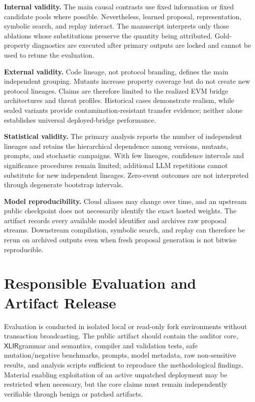 \documentclass[journal]{IEEEtran}
\theoremstyle{definition}
\newcommand{\xlir}{\ensuremath{\mathsf{XLIR}}}
\begin{document}
\noindent\textbf{Internal validity.} The main causal contrasts use fixed information or fixed candidate pools where possible. Nevertheless, learned proposal, representation, symbolic search, and replay interact. The manuscript interprets only those ablations whose substitutions preserve the quantity being attributed. Gold-property diagnostics are executed after primary outputs are locked and cannot be used to retune the evaluation.

\noindent\textbf{External validity.} Code lineage, not protocol branding, defines the main independent grouping. Mutants increase property coverage but do not create new protocol lineages. Claims are therefore limited to the realized EVM bridge architectures and threat profiles. Historical cases demonstrate realism, while sealed variants provide contamination-resistant transfer evidence; neither alone establishes universal deployed-bridge performance.

\noindent\textbf{Statistical validity.} The primary analysis reports the number of independent lineages and retains the hierarchical dependence among versions, mutants, prompts, and stochastic campaigns. With few lineages, confidence intervals and significance procedures remain limited; additional LLM repetitions cannot substitute for new independent lineages. Zero-event outcomes are not interpreted through degenerate bootstrap intervals.

\noindent\textbf{Model reproducibility.} Cloud aliases may change over time, and an upstream public checkpoint does not necessarily identify the exact hosted weights. The artifact records every available model identifier and archives raw proposal streams. Downstream compilation, symbolic search, and replay can therefore be rerun on archived outputs even when fresh proposal generation is not bitwise reproducible.

\section{Responsible Evaluation and Artifact Release}
\label{sec:ethics}

Evaluation is conducted in isolated local or read-only fork environments without transaction broadcasting. The public artifact should contain the auditor core, \xlir grammar and semantics, compiler and validation tests, safe mutation/negative benchmarks, prompts, model metadata, raw non-sensitive results, and analysis scripts sufficient to reproduce the methodological findings. Material enabling exploitation of an active unpatched deployment may be restricted when necessary, but the core claims must remain independently verifiable through benign or patched artifacts.
\end{document}
